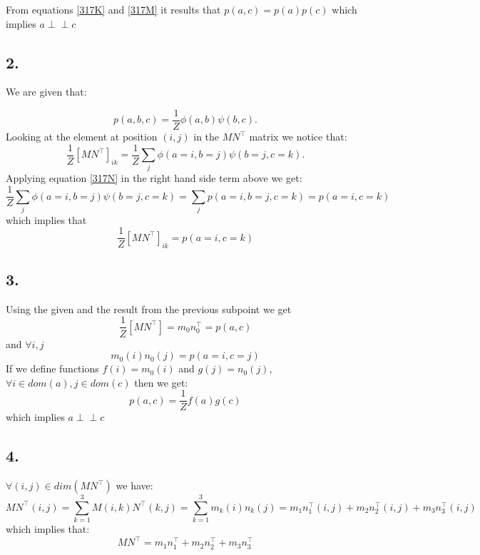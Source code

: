 \documentclass[11pt,a4paper,oneside]{report}
\newcommand\ci{\perp\!\!\!\perp} %
\begin{document}
From equations \eqref{317K} and \eqref{317M} it results that $p(a,c) = p(a)p(c)$ 
which implies $a \ci c$

\subsection*{2.}

We are given that:

\begin{equation}
\label{317N}
p(a,b,c) = \frac{1}{Z}\phi(a, b)\psi(b,c). 
\end{equation}
Looking at the element at position $(i,j)$ in the $MN^\top$ matrix we notice 
that:
\begin{equation}
\frac{1}{Z}\left[ MN^\top \right]_{ik} = \frac{1}{Z}\sum_{j}\phi(a=i, 
b=j)\psi(b=j, c=k). 
\end{equation}
Applying equation \eqref{317N} in the right hand side term above we get:
\begin{equation}
\frac{1}{Z}\sum_{j}\phi(a=i, b=j)\psi(b=j, c=k) = \sum_{j}p(a = i, b = j, c = k) 
= p(a = i, c = k) 
\end{equation}
which implies that
\begin{equation}
\frac{1}{Z}\left[ MN^\top \right]_{ik} = p(a = i, c = k) 
\end{equation}

\subsection*{3.}

Using the given and the result from the previous subpoint we get
\begin{equation}
 \frac{1}{Z}\left[ MN^\top \right] = m_0n_0^\top = p(a, c) 
\end{equation}
and $\forall i,j$
\begin{equation}
 m_0(i)n_0(j) = p(a=i, c=j) 
\end{equation}
If we define functions $f(i)=m_0(i)$ and $g(j)=n_0(j)$, $\forall i \in dom(a), j 
\in dom(c)$ then we get:
$$ p(a,c) = \frac{1}{Z}f(a)g(c)$$ which implies $a \ci c$

\subsection*{4.}

$\forall (i,j) \in dim(MN^\top)$ we have:
$$MN^\top(i,j) = \sum_{k=1}^{3}M(i,k)N^\top(k,j) = \sum_{k=1}^{3} m_k(i)n_k(j) = 
m_1n_1^\top(i,j) + m_2n_2^\top(i,j) + m_3n_3^\top(i,j)$$  
which implies that:
$$ MN^\top = m_1n_1^\top + m_2n_2^\top + m_3n_3^\top$$
\end{document}
